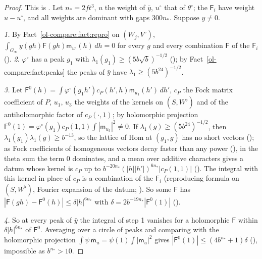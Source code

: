 \begin{proof}
This is . Let $n_*=2ft^3$, $u$ the weight of $\bar y$, $u^\circ$ that of $\theta^\circ$; the $\mathsf F_i$ have weight
$u-u^\circ$, and all weights are dominant with gaps $300n_*$. Suppose $y\ne0$.

\emph{1.} By Fact~\ref{ol-compare:fact:repro} on $(W_j,V^\circ)$, $\int_{G_\infty}y(gh)\mathsf F(gh)\mathsf m_{u^\circ}(h)\,dh=0$ for
every $g$ and every combination $\mathsf F$ of the $\mathsf F_i$
().
\emph{2.} $\varphi^\circ$ has a peak $g_1$ with $\lambda_1(g_1)\ge(5b\sqrt b)^{-1/2}$
(); by Fact~\ref{ol-compare:fact:peaks} the peaks of $\bar y$ have $\lambda_1\ge(5b^{24})^{-1/2}$.

\emph{3.} Let $\mathsf F^0(h)=\int\varphi^\circ(g_1h')c_P(h',h)\mathsf m_{u_1}(h')\,dh'$, $c_P$ the Fock matrix
coefficient of $P$, $u_1$, $u_3$ the weights of the kernels on $(S,W^\flat)$ and of the antiholomorphic factor
of $c_P(\cdot,1)$; by holomorphic projection $\mathsf F^0(1)=\varphi^\circ(g_1)c_P(1,1)\int|\mathsf m_{u_3}|^2\ne0$.
If $\lambda_1(g)\ge(5b^{24})^{-1/2}$, then $\lambda_1(g_1)\lambda_1(g)\ge b^{-13}$, so the lattice of
$\mathrm{Hom}$ at $(g_1,g)$ has no short vectors (); as Fock
coefficients of homogeneous vectors decay faster than any power
(), in the theta sum the term $0$ dominates, and a
mean over additive characters gives a datum whose kernel is $c_P$ up to
$b^{-20n_*}(|h||h'|)^{6n_*}|c_P(1,1)|$ ().
The integral with this kernel in place of $c_P$ is a combination of the $\mathsf F_i$ (reproducing
formula on $(S,W^\flat)$, Fourier expansion of the datum; ).
So some $\mathsf F$ has $|\mathsf F(gh)-\mathsf F^0(h)|\le\delta|h|^{6n_*}$ with $\delta=2b^{-19n_*}|\mathsf F^0(1)|$
().

\emph{4.} So at every peak of $\bar y$ the integral of step 1 vanishes for a holomorphic $\mathsf F$
within $\delta|h|^{6n_*}$ of $\mathsf F^0$. Averaging over a circle of peaks and comparing with the
holomorphic projection $\int\psi\,\bar{\mathsf m}_u=\psi(1)\int|\mathsf m_u|^2$ gives $|\mathsf F^0(1)|\le(4b^{n_*}+1)\delta$
(), impossible as $b^{n_*}>10$.
\end{proof}


